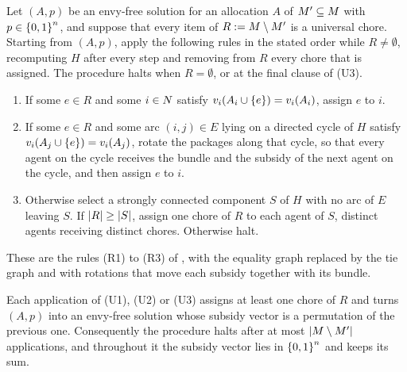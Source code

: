 Let $(A,p)$ be an envy-free solution for an allocation $A$ of $M'\subseteq M$
with $p\in\left\{0,1\right\}^n$, and suppose that every item of $R:=M\setminus M'$ is
a universal chore. Starting from $(A,p)$, apply the following rules in the stated
order while $R\ne\emptyset$, recomputing $H$ after every step and removing from
$R$ every chore that is assigned. The procedure halts when $R=\emptyset$, or at
the final clause of (U3).
\begin{enumerate}
  \item[(U1)] If some $e\in R$ and some $i\in N$ satisfy
    $v_i(A_i\cup\left\{e\right\})=v_i(A_i)$, assign $e$ to $i$.
  \item[(U2)] If some $e\in R$ and some arc $(i,j)\in E$ lying on a directed
    cycle of $H$ satisfy $v_i(A_j\cup\left\{e\right\})=v_i(A_j)$, rotate the packages
    along that cycle, so that every agent on the cycle receives the bundle and
    the subsidy of the next agent on the cycle, and then assign $e$ to $i$.
  \item[(U3)] Otherwise select a strongly connected component $S$ of $H$ with no
    arc of $E$ leaving $S$. If $\left\lvert R\right\rvert\ge\left\lvert S\right\rvert$, assign one chore of $R$ to each
    agent of $S$, distinct agents receiving distinct chores. Otherwise halt.
\end{enumerate}
These are the rules (R1) to (R3) of , with the equality
graph replaced by the tie graph and with rotations that move each subsidy
together with its bundle.

\begin{lemma}
\label{lem:gf-step}
Each application of (U1), (U2) or (U3) assigns at least one chore of $R$ and
turns $(A,p)$ into an envy-free solution whose subsidy vector is a permutation of
the previous one. Consequently the procedure halts after at most
$\left\lvert M\setminus M'\right\rvert$ applications, and throughout it the subsidy vector
lies in $\left\{0,1\right\}^n$ and keeps its sum.
\end{lemma}

